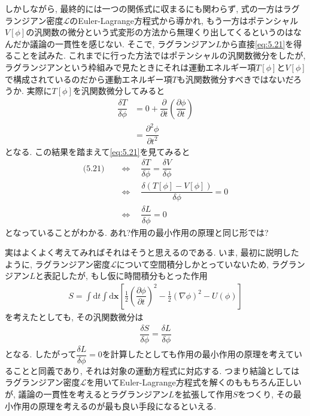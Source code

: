 \documentclass[dvipdfmx,11pt,a4paper,oneside,openany]{jsbook}
\begin{document}
しかしながら, 最終的には一つの関係式に収まるにも関わらず, 式の一方はラグランジアン密度$\mathcal{L}$のEuler-Lagrange方程式から導かれ, もう一方はポテンシャル$V[\phi]$の汎関数の微分という式変形の方法から無理くり出してくるというのはなんだか議論の一貫性を感じない. そこで, ラグランジアン$L$から直接\eqref{eq:5.21}を得ることを試みた. これまでに行った方法ではポテンシャルの汎関数微分をしたが, ラグランジアンという枠組みで見たときにそれは運動エネルギー項$T[\phi]$と$V[\phi]$で構成されているのだから運動エネルギー項$T$も汎関数微分すべきではないだろうか. 実際に$T[\phi]$を汎関数微分してみると
\begin{align*}
    \dfrac{\delta T}{\delta \phi} & =0+\dfrac{\partial}{\partial t}\left(\dfrac{\partial \phi}{\partial t}\right) \\
                                  & =\dfrac{\partial^2 \phi}{\partial t^2}
\end{align*}
となる. この結果を踏まえて\eqref{eq:5.21}を見てみると
\begin{align*}
    \text{(5.21)}\quad & \Leftrightarrow \quad \dfrac{\delta T}{\delta \phi} =\dfrac{\delta V}{\delta \phi} \\
                       & \Leftrightarrow \quad \dfrac{\delta \left(T[\phi]-V[\phi]\right)}{\delta \phi}=0   \\
                       & \Leftrightarrow \quad \dfrac{\delta L}{\delta \phi}=0
\end{align*}
となっていることがわかる. あれ?作用の最小作用の原理と同じ形では?

実はよくよく考えてみればそれはそうと思えるのである. いま, 最初に説明したように, ラグランジアン密度$\mathcal{L}$について空間積分しかとっていないため, ラグランジアン$L$と表記したが, もし仮に時間積分もとった作用
\begin{align*}
    S  =\int\mathrm{d}t\int \mathrm{d}\bm{x}\left[\frac{1}{2}\left(\dfrac{\partial\phi}{\partial t}\right)^2-\frac{1}{2}(\nabla\phi)^2-U(\phi)\right]
\end{align*}
を考えたとしても, その汎関数微分は
\begin{align*}
    \dfrac{\delta S}{\delta \phi}=\dfrac{\delta L}{\delta \phi}
\end{align*}
となる. したがって$\dfrac{\delta L}{\delta \phi}=0$を計算したとしても作用の最小作用の原理を考えていることと同義であり, それは対象の運動方程式に対応する. つまり結論としてはラグランジアン密度$\mathcal{L}$を用いてEuler-Lagrange方程式を解くのももちろん正しいが, 議論の一貫性を考えるとラグランジアン$L$を拡張して作用$S$をつくり, その最小作用の原理を考えるのが最も良い手段になるといえる.
\end{document}
